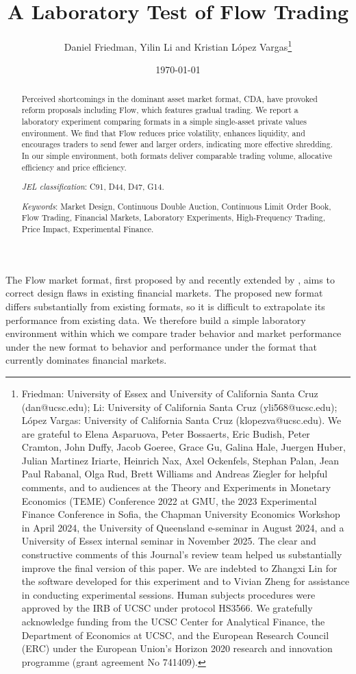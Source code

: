 \documentclass[12pt]{article}
\title{A Laboratory Test of Flow Trading}
\author{Daniel Friedman, Yilin Li and Kristian L\'opez Vargas\thanks{%
Friedman: University of Essex and University of California Santa Cruz (dan@ucsc.edu);
Li: University of California Santa Cruz (yli568@ucsc.edu); 
L\'opez Vargas: University of California Santa Cruz (klopezva@ucsc.edu). 
We are grateful to Elena Asparuova, Peter Bossaerts, Eric Budish, Peter Cramton, John Duffy,  Jacob Goeree, Grace Gu, Galina Hale, Juergen Huber, Julian Martinez Iriarte, Heinrich Nax, Axel Ockenfels, Stephan Palan,  Jean Paul Rabanal, Olga Rud, Brett Williams and  Andreas Ziegler
for helpful comments,  
and to audiences at the Theory and Experiments in Monetary Economics (TEME) Conference 2022 at GMU, the 2023 Experimental Finance Conference in Sofia, the Chapman University Economics Workshop in April 2024, the University of Queensland e-seminar in August 2024, and a University of Essex internal seminar in November 2025.
The clear and constructive comments of this Journal's review team helped us substantially improve the final version of this paper.
We are indebted to Zhangxi Lin for the software developed for this experiment and to Vivian Zheng for assistance in conducting experimental sessions. 
Human subjects procedures were approved by the IRB of UCSC under protocol HS3566. 
We gratefully acknowledge funding from the UCSC Center for Analytical Finance, the Department of Economics at UCSC, and the European Research Council (ERC) under the European Union’s Horizon 2020 research and innovation programme (grant agreement No 741409).}}
\date{\today}
\begin{document}
\maketitle

\vspace{-.4in}
\begin{abstract}
\begin{singlespace}
Perceived shortcomings in the dominant asset market format, CDA, have provoked reform proposals including Flow, which features gradual trading. 
We report a laboratory experiment comparing formats in a simple single-asset private values environment. 
We find that Flow reduces price volatility, enhances liquidity, and encourages traders to send fewer and larger orders, indicating more effective shredding. 
In our simple environment, both formats deliver comparable trading volume, allocative efficiency and price efficiency. 

\bigskip

\noindent\textit{JEL classification}: C91, D44, D47, G14.

\noindent \textit{Keywords}: Market Design, Continuous Double Auction, Continuous Limit Order Book, Flow Trading, Financial Markets, Laboratory Experiments, High-Frequency Trading, Price Impact, Experimental Finance.

\end{singlespace}
\end{abstract}




\newpage
\setcounter{page}{1}

The Flow market format, first proposed by \cite{Kyle2017} and recently extended by \cite{Budish2023}, aims to 
correct design flaws in existing financial markets. 
The proposed new format differs substantially from existing formats,
so it is difficult to extrapolate its performance from existing data. 
We therefore build a simple laboratory environment within which we compare trader behavior and market performance under the new format to behavior and performance under the format that currently dominates financial markets.
\end{document}
